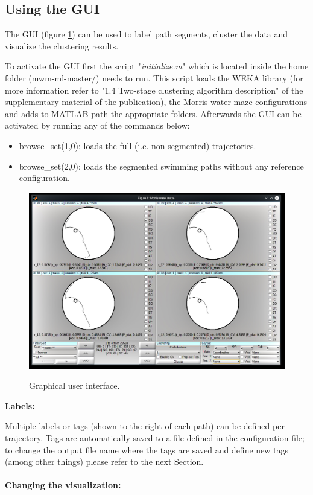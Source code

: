 \documentclass[12pt,titlepage]{article}
\begin{document}
\begin{doublespace}
\subsection{Using the GUI}

The GUI (figure \ref{gui}) can be used to label path segments, cluster the data and visualize the clustering results.

To activate the GUI first the script "\textit{initialize.m}" which is located inside the home folder (mwm-ml-master$/$) needs to run. This script loads the WEKA library (for more information refer to "1.4 Two-stage clustering algorithm description" of the supplementary material of the publication), the Morris water maze configurations and adds to MATLAB path the appropriate folders. Afterwards the GUI can be activated by running any of the commands below:
\begin{itemize}
	\item browse\_set(1,0): loads the full (i.e. non-segmented) trajectories.
	\item browse\_set(2,0): loads the segmented swimming paths without any reference configuration.
\end{itemize}

\begin{figure}[H]
	\begin{center}
		\includegraphics[width=1\textwidth]{gui.jpg}\\
		\caption [gui]{Graphical user interface.}\label{gui}
	\end{center}
\end{figure}

\noindent\textbf{Labels:}

Multiple labels or tags (shown to the right of each path) can be defined per trajectory. Tags are automatically saved to a file defined in the configuration file; to change the output file name where the tags are saved and define new tags (among other things) please refer to the next Section.
\\
\\
\noindent\textbf{Changing the visualization:}


\end{doublespace}
\end{document}
